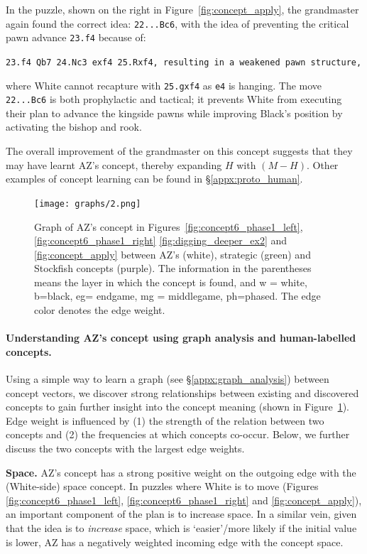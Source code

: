 \documentclass{article}
\newcommand{\ct}[1]{\texttt{#1}}
\begin{document}
In the puzzle, shown on the right in Figure~\ref{fig:concept_apply}, the grandmaster again found the correct idea: \ct{22...Bc6}, with the idea of preventing the critical pawn advance \ct{23.f4} because of:
\begin{displayquote}
\ct{23.f4 Qb7 24.Nc3 exf4 25.Rxf4, resulting in a weakened pawn structure,}
\end{displayquote}
where White cannot recapture with \ct{25.gxf4} as \ct{e4} is hanging. 
The move \ct{22...Bc6} is both prophylactic and tactical; it prevents White from executing their plan to advance the kingside pawns while improving Black's position by activating the bishop and rook. 

The overall improvement of the grandmaster on this concept suggests that they may have learnt AZ's concept, thereby expanding $H$ with $(M-H)$. Other examples of concept learning can be found in \S\ref{appx:proto_human}. 

\begin{figure}[!ht]
\centering
\caption{Graph of AZ's concept in Figures~\ref{fig:concept6_phase1_left}, \ref{fig:concept6_phase1_right} \ref{fig:digging_deeper_ex2} and \ref{fig:concept_apply} between AZ's (white), strategic (green) and Stockfish concepts (purple).
The information in the parentheses means the layer in which the concept is found, and w = white, b=black, eg= endgame, mg = middlegame, ph=phased. The edge color denotes the edge weight.}
\texttt{[image: graphs/2.png]}
\label{fig:graph}
\end{figure}

\paragraph{Understanding AZ's concept using graph analysis and human-labelled concepts.}
Using a simple way to learn a graph (see \S\ref{appx:graph_analysis}) between concept vectors, we discover strong relationships between existing and discovered concepts to gain further insight into the concept meaning (shown in Figure~\ref{fig:graph}).
Edge weight is influenced by (1) the strength of the relation between two concepts and (2) the frequencies at which concepts co-occur. 
Below, we further discuss the two concepts with the largest edge weights.

\textbf{Space.} AZ's concept has a strong positive weight on the outgoing edge with the (White-side) space concept. In puzzles where White is to move (Figures~ \ref{fig:concept6_phase1_left}, \ref{fig:concept6_phase1_right} and \ref{fig:concept_apply}), an important component of the plan is to increase space. 
In a similar vein, given that the idea is to \textit{increase} space, which is `easier'/more likely if the initial value is lower, AZ has a negatively weighted incoming edge with the concept space. 
\end{document}
